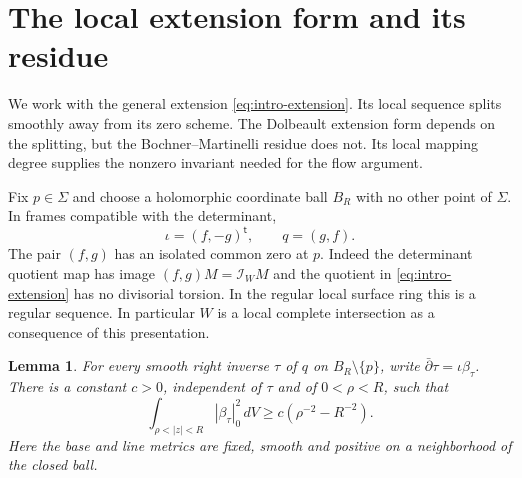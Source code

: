 \documentclass[11pt]{amsart}
\newtheorem{lemma}[theorem]{Lemma}
\theoremstyle{definition}
\theoremstyle{remark}
\newcommand{\cI}{\mathcal I}
\newcommand{\db}{\bar\partial}
\begin{document}
\section{The local extension form and its residue}\label{sec:residue}

We work with the general extension \eqref{eq:intro-extension}. Its
local sequence splits smoothly away from its zero scheme. The
Dolbeault extension form depends on the splitting, but the
Bochner--Martinelli residue does not. Its local mapping degree supplies
the nonzero invariant needed for the flow argument.

Fix $p\in\Sigma$ and choose a holomorphic coordinate ball $B_R$ with
no other point of $\Sigma$. In frames compatible with the determinant,
\begin{equation}\label{eq:general-local}
\iota=(f,-g)^{\mathsf t},\qquad q=(g,f).
\end{equation}
The pair $(f,g)$ has an isolated common zero at $p$. Indeed the
determinant quotient map has image $(f,g)M=\cI_WM$ and the quotient in
\eqref{eq:intro-extension} has no divisorial torsion. In the regular local
surface ring this is a regular sequence. In particular $W$ is a local
complete intersection as a consequence of this presentation.

\begin{lemma}\label{lem:residue}
For every smooth right inverse $\tau$ of $q$ on $B_R\setminus\{p\}$,
write $\db\tau=\iota\beta_\tau$. There is a constant $c>0$, independent
of $\tau$ and of $0<\rho<R$, such that
\begin{equation}\label{eq:residue-energy}
\int_{\rho<|z|<R}|\beta_\tau|_0^2\,dV
\ge c(\rho^{-2}-R^{-2}).
\end{equation}
Here the base and line metrics are fixed, smooth and positive on a
neighborhood of the closed ball.
\end{lemma}
\end{document}
